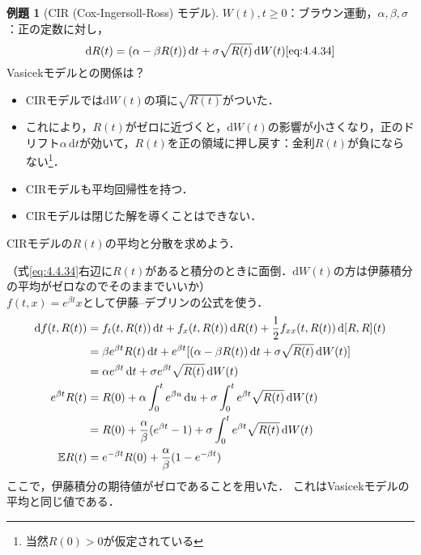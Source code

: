 \documentclass[a4paper, lualatex, ja=standard]{bxjsarticle}
\theoremstyle{definition}
\newtheorem{expl}[thm]{例題}
\newcommand{\E}{\mathbb{E}}
\newcommand{\diff}{\mathrm{d}}
\begin{document}
\begin{expl}[CIR (Cox-Ingersoll-Ross) モデル]
  $W(t),t\geq0$：ブラウン運動，$\alpha,\beta,\sigma$：正の定数に対し，
  \begin{equation}
    \diff R(t) = (\alpha - \beta R(t))\,\diff t + \sigma\sqrt{R(t)}\,\diff W(t)
    \eqref{eq:4.4.34}
  \end{equation}
  Vasicekモデルとの関係は？
  \begin{itemize}
    \item CIRモデルでは$\diff W(t)$の項に$\sqrt{R(t)}$がついた．
    \item これにより，$R(t)$がゼロに近づくと，$\diff W(t)$の影響が小さくなり，正のドリフト$\alpha\,\diff t$が効いて，$R(t)$を正の領域に押し戻す：金利$R(t)$が負にならない\footnote{当然$R(0)>0$が仮定されている}．
    \item CIRモデルも平均回帰性を持つ．
    \item CIRモデルは閉じた解を導くことはできない．
  \end{itemize}

  CIRモデルの$R(t)$の平均と分散を求めよう．

  （式\eqref{eq:4.4.34}右辺に$R(t)$があると積分のときに面倒．$\diff W(t)$の方は伊藤積分の平均がゼロなのでそのままでいいか）\\
  $f(t,x)=e^{\beta t}x$として伊藤--デブリンの公式を使う．
  \begin{align}
    \diff f(t,R(t)) &= f_t(t,R(t))\,\diff t + f_x(t,R(t))\,\diff R(t) + \frac{1}{2}f_{xx}(t,R(t))\,\diff [R,R](t)\notag\\
    &= \beta e^{\beta t}R(t)\,\diff t + e^{\beta t}[(\alpha-\beta R(t))\,\diff t+\sigma\sqrt{R(t)}\,\diff W(t)]\notag\\
    &= \alpha e^{\beta t}\,\diff t + \sigma e^{\beta t}\sqrt{R(t)}\,\diff W(t)\\
    e^{\beta t}R(t) &= R(0) + \alpha\int_0^t e^{\beta u}\,\diff u + \sigma\int_0^t e^{\beta t}\sqrt{R(t)}\,\diff W(t)\notag\\
    &= R(0) + \frac{\alpha}{\beta}(e^{\beta t}-1) + \sigma\int_0^t e^{\beta t}\sqrt{R(t)}\,\diff W(t)\notag\\
    \E R(t) &= e^{-\beta t} R(0) + \frac{\alpha}{\beta}(1-e^{-\beta t})
  \end{align}
  ここで，伊藤積分の期待値がゼロであることを用いた．
  これはVasicekモデルの平均と同じ値である．


\end{expl}
\end{document}
